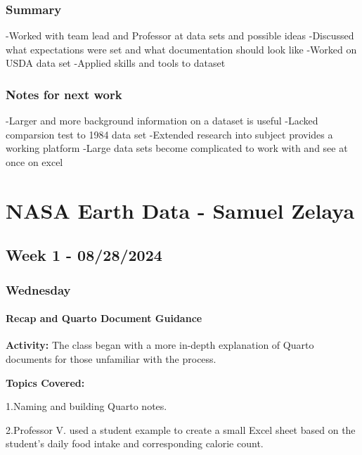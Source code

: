 \documentclass[
  letterpaper,
  DIV=11,
  numbers=noendperiod]{scrreprt}
\begin{document}
\subsection{Summary}\label{summary-1}

-Worked with team lead and Professor at data sets and possible ideas
-Discussed what expectations were set and what documentation should look
like -Worked on USDA data set -Applied skills and tools to dataset

\subsection{Notes for next work}\label{notes-for-next-work}

-Larger and more background information on a dataset is useful -Lacked
comparsion test to 1984 data set -Extended research into subject
provides a working platform -Large data sets become complicated to work
with and see at once on excel


\chapter{NASA Earth Data - Samuel
Zelaya}\label{nasa-earth-data---samuel-zelaya}

\section{Week 1 - 08/28/2024}\label{week-1---08282024}

\subsection{Wednesday}\label{wednesday-1}

\subsubsection{Recap and Quarto Document
Guidance}\label{recap-and-quarto-document-guidance}

\textbf{Activity:} The class began with a more in-depth explanation of
Quarto documents for those unfamiliar with the process.

\textbf{Topics Covered:}

1.Naming and building Quarto notes.

2.Professor V. used a student example to create a small Excel sheet
based on the student's daily food intake and corresponding calorie
count.
\end{document}
